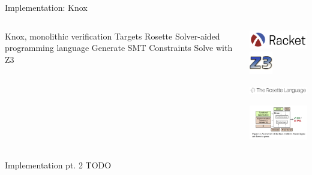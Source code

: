 \begin{frame}{Implementation: Knox}
\begin{columns}
  \centering
  \begin{outline}
  \1 Knox, monolithic verification
  \1 Targets Rosette \cite{Torlak2013Growing}
  \2 Solver-aided programming language
  \1 Generate SMT Constraints
  \2 Solve with Z3 \cite{De2008Z3}
  \end{outline}

  \centering
  \begin{center}
  \includegraphics[width=3cm]{racket_logo.png}
  \includegraphics[width=1cm]{z3_logo.jpg}

  \vspace{0.5cm}

  \includegraphics[width=5cm]{rosette_logo.png}

  \vspace{0.5cm}

  \includegraphics[width=5cm]{fig_11.png}

  \end{center}
\end{columns}
\end{frame}

\begin{frame}{Implementation pt. 2}
  TODO
\end{frame}

